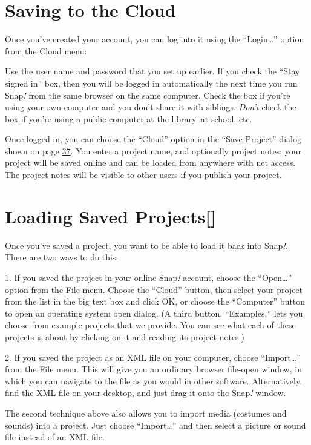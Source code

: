 \documentclass[
  letterpaper,
]{book}
\begin{document}
\section{Saving to the Cloud}\label{saving-to-the-cloud}

Once you've created your account, you can log into it using the
``Login\ldots{}'' option from the Cloud menu:

Use the user name and password that you set up earlier. If you check the
``Stay signed in'' box, then you will be logged in automatically the
next time you run Snap\emph{!} from the same browser on the same
computer. Check the box if you're using your own computer and you don't
share it with siblings. \emph{Don't} check the box if you're using a
public computer at the library, at school, etc.

Once logged in, you can choose the ``Cloud'' option in the ``Save
Project'' dialog shown on page \hyperref[saveas]{37}. You enter a
project name, and optionally project notes; your project will be saved
online and can be loaded from anywhere with net access. The project
notes will be visible to other users if you publish your project.

\section{Loading Saved Projects{[}{]}}\label{loading-saved-projects}

Once you've saved a project, you want to be able to load it back into
Snap\emph{!}. There are two ways to do this:

1. If you saved the project in your online Snap\emph{!} account, choose
the ``Open\ldots{}'' option from the File menu. Choose the ``Cloud''
button, then select your project from the list in the big text box and
click OK, or choose the ``Computer'' button to open an operating system
open dialog. (A third button, ``Examples,'' lets you choose from example
projects that we provide. You can see what each of these projects is
about by clicking on it and reading its project notes.)

2. If you saved the project as an XML file on your computer, choose
``Import\ldots{}'' from the File menu. This will give you an ordinary
browser file-open window, in which you can navigate to the file as you
would in other software. Alternatively, find the XML file on your
desktop, and just drag it onto the Snap\emph{!} window.

The second technique above also allows you to import media (costumes and
sounds) into a project. Just choose ``Import\ldots{}'' and then select a
picture or sound file instead of an XML file.
\end{document}
